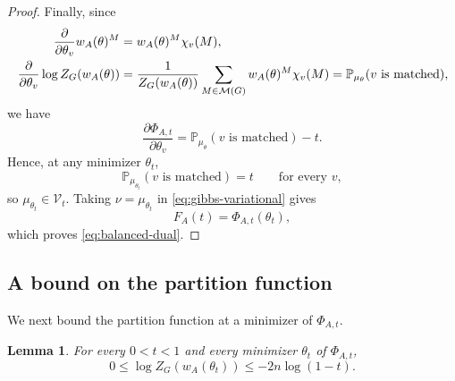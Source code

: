 \documentclass[11pt,reqno,letterpaper]{amsart}
\numberwithin{equation}{section}
\newtheorem{lemma}[lemma]{Lemma}
\theoremstyle{definition}
\theoremstyle{remark}
\newcommand{\PP}{\mathbb P}
\newcommand{\cM}{\mathcal M}
\begin{document}
\begin{proof}
Finally, since 
\begin{align}\label{eq:vertex-marginal}
\frac{\partial}{\partial\theta_v}w_A(\theta)^M&=w_A(\theta)^M\chi_v(M),\notag\\
    \frac{\partial}{\partial\theta_v}
  \log Z_G(w_A(\theta))
  &=
  \frac{1}{Z_G(w_A(\theta))}
  \sum_{M\in\cM(G)}
  w_A(\theta)^M
  \chi_v(M)
  =
  \PP_{\mu_\theta}(v\text{ is matched}),
\end{align}
we have
\begin{equation*}
  \frac{\partial\Phi_{A,t}}{\partial\theta_v}
  =
  \PP_{\mu_\theta}(v\text{ is matched})-t.
\end{equation*}
Hence, at any minimizer $\theta_t$,
\[
  \PP_{\mu_{\theta_t}}(v\text{ is matched})=t
  \qquad\text{for every }v,
\]
so $\mu_{\theta_t}\in\mathcal V_t$. Taking
$\nu=\mu_{\theta_t}$ in \cref{eq:gibbs-variational} gives
\[
  F_A(t)=\Phi_{A,t}(\theta_t),
\]
which proves \cref{eq:balanced-dual}.
\end{proof}
\medskip

\subsection{A bound on the partition function}
We next bound the partition function at a minimizer of
$\Phi_{A,t}$.

\begin{lemma}\label{lem:partition-bound}
For every $0<t<1$ and every minimizer $\theta_t$ of
$\Phi_{A,t}$,
\begin{equation}\label{eq:logZ-bound}
  0
  \leq
  \log Z_G(w_A(\theta_t))
  \leq
  -2n\log(1-t).
\end{equation}
\end{lemma}
\end{document}
